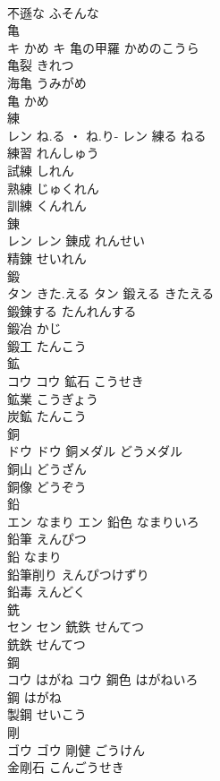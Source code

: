 \documentclass[8pt]{extreport}
\begin{document}
\begin{CJK}{UTF8}{min}
\\	不遜な	ふそんな	
\\	亀	
\\	キ	かめ	キ	亀の甲羅	かめのこうら	
\\	亀裂	きれつ	
\\	海亀	うみがめ	
\\	亀	かめ	
\\	練	
\\	レン	ね.る ・ ね.り-	レン	練る	ねる	
\\	練習	れんしゅう	
\\	試練	しれん	
\\	熟練	じゅくれん	
\\	訓練	くんれん	
\\	錬	
\\	レン		レン	錬成	れんせい	
\\	精錬	せいれん	
\\	鍛	
\\	タン	きた.える	タン	鍛える	きたえる	
\\	鍛錬する	たんれんする	
\\	鍛冶	かじ	
\\	鍛工	たんこう	
\\	鉱	
\\	コウ		コウ	鉱石	こうせき	
\\	鉱業	こうぎょう	
\\	炭鉱	たんこう	
\\	銅	
\\	ドウ		ドウ	銅メダル	どうメダル	
\\	銅山	どうざん	
\\	銅像	どうぞう	
\\	鉛	
\\	エン	なまり	エン	鉛色	なまりいろ	
\\	鉛筆	えんぴつ	
\\	鉛	なまり	
\\	鉛筆削り	えんぴつけずり	
\\	鉛毒	えんどく	
\\	銑	
\\	セン		セン	銑鉄	せんてつ	
\\	銑鉄	せんてつ	
\\	鋼	
\\	コウ	はがね	コウ	鋼色	はがねいろ	
\\	鋼	はがね	
\\	製鋼	せいこう	
\\	剛	
\\	ゴウ		ゴウ	剛健	ごうけん	
\\	金剛石	こんごうせき	

\end{CJK}
\end{document}
